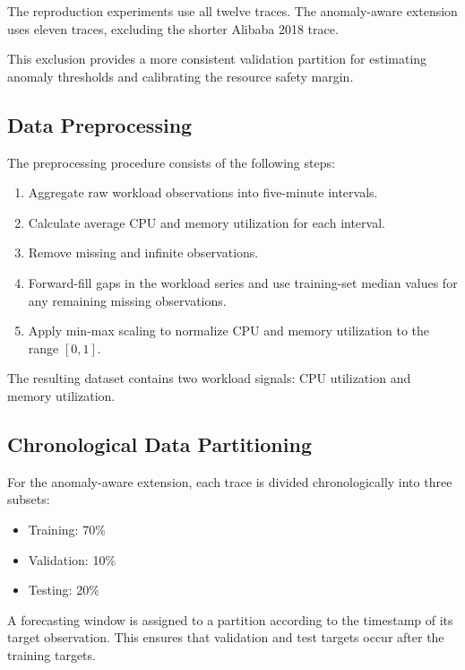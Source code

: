 \documentclass[conference]{IEEEtran}
\begin{document}
The reproduction experiments use all twelve traces. The anomaly-aware extension uses eleven traces, excluding the shorter Alibaba 2018 trace.

This exclusion provides a more consistent validation partition for estimating anomaly thresholds and calibrating the resource safety margin.

\subsection{Data Preprocessing}

The preprocessing procedure consists of the following steps:

\begin{enumerate}
\item Aggregate raw workload observations into five-minute intervals.

\item Calculate average CPU and memory utilization for each interval.

\item Remove missing and infinite observations.

\item Forward-fill gaps in the workload series and use training-set median values for any remaining missing observations.

\item Apply min-max scaling to normalize CPU and memory utilization to the range $[0,1]$.
\end{enumerate}

The resulting dataset contains two workload signals: CPU utilization and memory utilization.

\subsection{Chronological Data Partitioning}

For the anomaly-aware extension, each trace is divided chronologically into three subsets:

\begin{itemize}
\item Training: 70\%
\item Validation: 10\%
\item Testing: 20\%
\end{itemize}

A forecasting window is assigned to a partition according to the timestamp of its target observation. This ensures that validation and test targets occur after the training targets.
\end{document}
